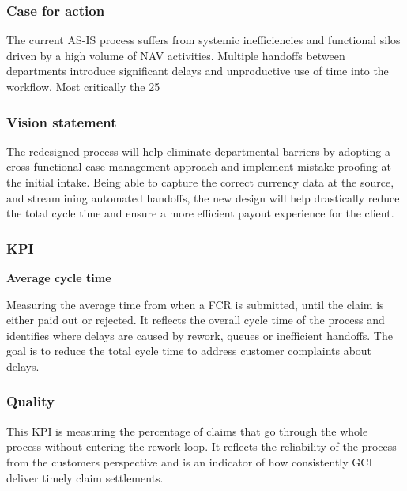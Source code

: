 

\subsubsection{Case for action}

The current AS-IS process suffers from systemic inefficiencies and functional silos driven by a high volume of NAV activities. Multiple handoffs between departments introduce significant delays and unproductive use of time into the workflow. Most critically the 25%

\subsubsection{Vision statement}
The redesigned process will help eliminate departmental barriers by adopting a cross-functional case management approach and implement mistake proofing at the initial intake. Being able to capture the correct currency data at the source, and streamlining automated handoffs, the new design will help drastically reduce the total cycle time and ensure a more efficient payout experience for the client. 

\subsubsection{KPI}
\textbf{Average cycle time}

Measuring the average time from when a FCR is submitted, until the claim is either paid out or rejected. It reflects the overall cycle time of the process and identifies where delays are caused by rework, queues or inefficient handoffs. The goal is to reduce the total cycle time to address customer complaints about delays. 

\subsubsection{Quality}
This KPI is measuring the percentage of claims that go through the whole process without entering the rework loop. It reflects the reliability of the process from the customers perspective and is an indicator of how consistently GCI deliver timely claim settlements. 

